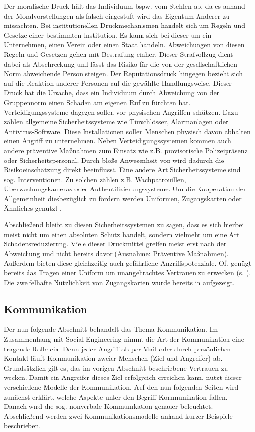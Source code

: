 Der moralische Druck hält das Individuum bspw. vom Stehlen ab, da es anhand der Moralvorstellungen als falsch eingestuft wird das Eigentum Anderer zu missachten.
Bei institutionellen Druckmechanismen handelt sich um Regeln und Gesetze einer bestimmten Institution.
Es kann sich bei dieser um ein Unternehmen, einen Verein oder einen Staat handeln.
Abweichungen von diesen Regeln und Gesetzen gehen mit Bestrafung einher. Dieser Strafvollzug dient dabei als Abschreckung und lässt das Risiko für die von der gesellschaftlichen Norm abweichende Person steigen.
Der Reputationsdruck hingegen bezieht sich auf die Reaktion anderer Personen auf die gewählte Handlungsweise.
Dieser Druck hat die Ursache, dass ein Individuum durch Abweichung von der Gruppennorm einen Schaden am eigenen Ruf zu fürchten hat.
Verteidigungssysteme dagegen sollen vor physischen Angriffen schützen. Dazu zählen allgemeine Sicherheitssysteme wie Türschlösser, Alarmanlagen oder Antivirus-Software.
Diese Installationen sollen Menschen physisch davon abhalten einen Angriff zu unternehmen.
Neben Verteidigungssystemen kommen auch andere präventive Maßnahmen zum Einsatz wie z.B. provisorische Polizeipräsenz oder Sicherheitspersonal.
Durch bloße Anwesenheit von wird dadurch die Risikoeinschätzung direkt beeinflusst.
Eine andere Art Sicherheitssysteme sind sog. Interventionen. Zu solchen zählen z.B. Wachpatrouillen, Überwachungskameras oder Authentifizierungssysteme.
Um die Kooperation der Allgemeinheit diesbezüglich zu fördern werden Uniformen, Zugangskarten oder Ähnliches genutzt \citep{liars-and-outliers}.

Abschließend bleibt zu diesen Sicherheitssystemen zu sagen, dass es sich hierbei meist nicht um einen absoluten Schutz handelt, sondern vielmehr um eine Art Schadensreduzierung.
Viele dieser Druckmittel greifen meist erst nach der Abweichung und nicht bereits davor (Ausnahme: Präventive Maßnahmen).
Außerdem bieten diese  gleichzeitig auch gefährliche Angriffspotenziale.
Oft genügt bereits das Tragen einer Uniform um unangebrachtes Vertrauen zu erwecken (s. ). Die zweifelhafte Nützlichkeit von Zugangskarten wurde bereits in   aufgezeigt.

\subsection{Kommunikation}\label{sec:kommunikation}

Der nun folgende Abschnitt behandelt das Thema Kommunikation.
Im Zusammenhang mit Social Engineering nimmt die Art der Kommunikation eine tragende Rolle ein.
Denn jeder Angriff ob per Mail oder durch persönlichen Kontakt läuft Kommunikation zweier Menschen (Ziel und Angreifer) ab.
Grundsätzlich gilt es, das im vorigen Abschnitt beschriebene Vertrauen zu wecken.
Damit ein Angreifer dieses Ziel erfolgreich erreichen kann, nutzt dieser verschiedene Modelle der Kommunikation.
Auf den nun folgenden Seiten wird zunächst erklärt, welche Aspekte unter den Begriff Kommunikation fallen.
Danach wird die sog. nonverbale Kommunikation genauer beleuchtet.
Abschließend werden zwei Kommunikationsmodelle anhand kurzer Beispiele beschrieben.

